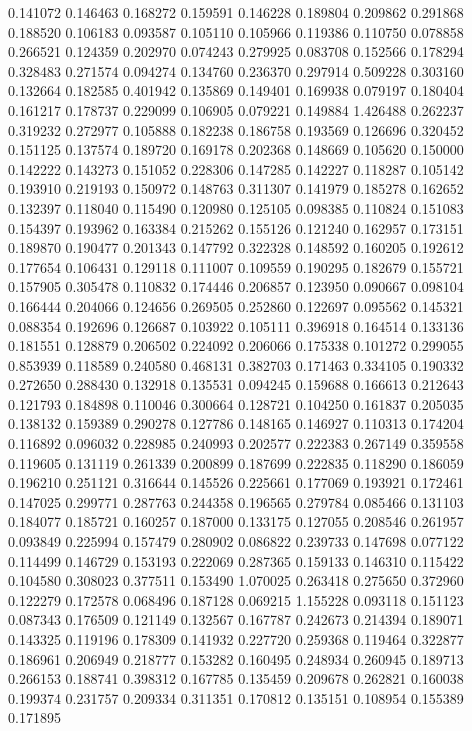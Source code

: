 0.141072
0.146463
0.168272
0.159591
0.146228
0.189804
0.209862
0.291868
0.188520
0.106183
0.093587
0.105110
0.105966
0.119386
0.110750
0.078858
0.266521
0.124359
0.202970
0.074243
0.279925
0.083708
0.152566
0.178294
0.328483
0.271574
0.094274
0.134760
0.236370
0.297914
0.509228
0.303160
0.132664
0.182585
0.401942
0.135869
0.149401
0.169938
0.079197
0.180404
0.161217
0.178737
0.229099
0.106905
0.079221
0.149884
1.426488
0.262237
0.319232
0.272977
0.105888
0.182238
0.186758
0.193569
0.126696
0.320452
0.151125
0.137574
0.189720
0.169178
0.202368
0.148669
0.105620
0.150000
0.142222
0.143273
0.151052
0.228306
0.147285
0.142227
0.118287
0.105142
0.193910
0.219193
0.150972
0.148763
0.311307
0.141979
0.185278
0.162652
0.132397
0.118040
0.115490
0.120980
0.125105
0.098385
0.110824
0.151083
0.154397
0.193962
0.163384
0.215262
0.155126
0.121240
0.162957
0.173151
0.189870
0.190477
0.201343
0.147792
0.322328
0.148592
0.160205
0.192612
0.177654
0.106431
0.129118
0.111007
0.109559
0.190295
0.182679
0.155721
0.157905
0.305478
0.110832
0.174446
0.206857
0.123950
0.090667
0.098104
0.166444
0.204066
0.124656
0.269505
0.252860
0.122697
0.095562
0.145321
0.088354
0.192696
0.126687
0.103922
0.105111
0.396918
0.164514
0.133136
0.181551
0.128879
0.206502
0.224092
0.206066
0.175338
0.101272
0.299055
0.853939
0.118589
0.240580
0.468131
0.382703
0.171463
0.334105
0.190332
0.272650
0.288430
0.132918
0.135531
0.094245
0.159688
0.166613
0.212643
0.121793
0.184898
0.110046
0.300664
0.128721
0.104250
0.161837
0.205035
0.138132
0.159389
0.290278
0.127786
0.148165
0.146927
0.110313
0.174204
0.116892
0.096032
0.228985
0.240993
0.202577
0.222383
0.267149
0.359558
0.119605
0.131119
0.261339
0.200899
0.187699
0.222835
0.118290
0.186059
0.196210
0.251121
0.316644
0.145526
0.225661
0.177069
0.193921
0.172461
0.147025
0.299771
0.287763
0.244358
0.196565
0.279784
0.085466
0.131103
0.184077
0.185721
0.160257
0.187000
0.133175
0.127055
0.208546
0.261957
0.093849
0.225994
0.157479
0.280902
0.086822
0.239733
0.147698
0.077122
0.114499
0.146729
0.153193
0.222069
0.287365
0.159133
0.146310
0.115422
0.104580
0.308023
0.377511
0.153490
1.070025
0.263418
0.275650
0.372960
0.122279
0.172578
0.068496
0.187128
0.069215
1.155228
0.093118
0.151123
0.087343
0.176509
0.121149
0.132567
0.167787
0.242673
0.214394
0.189071
0.143325
0.119196
0.178309
0.141932
0.227720
0.259368
0.119464
0.322877
0.186961
0.206949
0.218777
0.153282
0.160495
0.248934
0.260945
0.189713
0.266153
0.188741
0.398312
0.167785
0.135459
0.209678
0.262821
0.160038
0.199374
0.231757
0.209334
0.311351
0.170812
0.135151
0.108954
0.155389
0.171895
